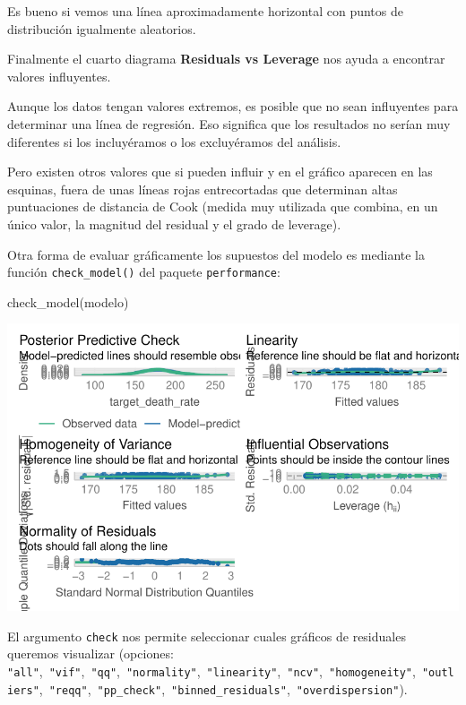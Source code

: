 \documentclass[
  letterpaper,
  DIV=11,
  numbers=noendperiod]{scrartcl}
\newenvironment{Shaded}{\begin{snugshade}}{\end{snugshade}}
\newcommand{\FunctionTok}[1]{\textcolor[rgb]{0.28,0.35,0.67}{#1}}
\newcommand{\NormalTok}[1]{\textcolor[rgb]{0.00,0.23,0.31}{#1}}
\begin{document}
Es bueno si vemos una línea aproximadamente horizontal con puntos de
distribución igualmente aleatorios.

Finalmente el cuarto diagrama \textbf{Residuals vs Leverage} nos ayuda a
encontrar valores influyentes.

Aunque los datos tengan valores extremos, es posible que no sean
influyentes para determinar una línea de regresión. Eso significa que
los resultados no serían muy diferentes si los incluyéramos o los
excluyéramos del análisis.

Pero existen otros valores que si pueden influir y en el gráfico
aparecen en las esquinas, fuera de unas líneas rojas entrecortadas que
determinan altas puntuaciones de distancia de Cook (medida muy utilizada
que combina, en un único valor, la magnitud del residual y el grado de
leverage).

Otra forma de evaluar gráficamente los supuestos del modelo es mediante
la función \texttt{check\_model()} del paquete \texttt{performance}:

\begin{Shaded}
\begin{Highlighting}[]
\FunctionTok{check\_model}\NormalTok{(modelo)}
\end{Highlighting}
\end{Shaded}

\begin{center}
\includegraphics{index_files/figure-pdf/unnamed-chunk-31-1.pdf}
\end{center}

El argumento \texttt{check} nos permite seleccionar cuales gráficos de
residuales queremos visualizar (opciones:
\texttt{"all"},~\texttt{"vif"},~\texttt{"qq"},~\texttt{"normality"},~\texttt{"linearity"},~\texttt{"ncv"},~\texttt{"homogeneity"},~\texttt{"outliers"},~\texttt{"reqq"},~\texttt{"pp\_check"},~\texttt{"binned\_residuals"},~\texttt{"overdispersion"}).
\end{document}
